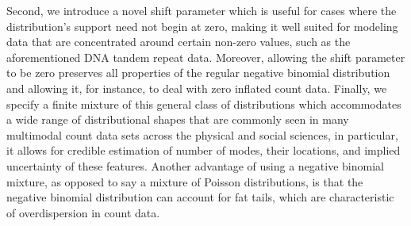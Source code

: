 \documentclass[11pt]{article}
\begin{document}

Second, we introduce a novel shift parameter which is useful for cases where the distribution's support need not begin at zero, making it well suited for modeling data that are concentrated around certain non-zero values, such as the aforementioned DNA tandem repeat data. Moreover, allowing the shift parameter to be zero preserves all properties of the regular negative binomial distribution and allowing it, for instance, to deal with zero inflated count data. Finally, we specify a finite mixture of this general class of distributions which accommodates a wide range of distributional shapes that are commonly seen in many multimodal count data sets across the physical and social sciences, in particular, it allows for credible estimation of number of modes, their locations, and implied uncertainty of these features. Another advantage of using a negative binomial mixture, as opposed to say a mixture of Poisson distributions, is that the negative binomial distribution can account for fat tails, which are characteristic of overdispersion in count data.
\end{document}
